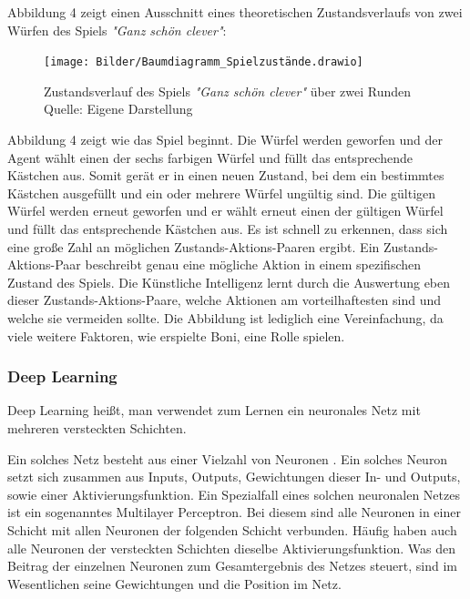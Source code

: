 Abbildung 4 zeigt einen Ausschnitt eines theoretischen Zustandsverlaufs von zwei Würfen des Spiels \textit{"Ganz schön clever"}:
\nopagebreak
\begin{figure}[H]
	\texttt{[image: Bilder/Baumdiagramm\_Spielzustände.drawio]} 
	\caption[Zustandsverlauf des Spiels \textit{"Ganz schön clever"} über zwei Runden]{Zustandsverlauf des Spiels \textit{"Ganz schön clever"} über zwei Runden\\ Quelle: Eigene Darstellung}
\end{figure}	

Abbildung 4 zeigt wie das Spiel beginnt. Die Würfel werden geworfen und der Agent wählt einen der sechs farbigen Würfel und füllt das entsprechende Kästchen aus. Somit gerät er in einen neuen Zustand, bei dem ein bestimmtes Kästchen ausgefüllt und ein oder mehrere Würfel ungültig sind. Die gültigen Würfel werden erneut geworfen und er wählt erneut einen der gültigen Würfel und füllt das entsprechende Kästchen aus. Es ist schnell zu erkennen, dass sich eine große Zahl an möglichen Zustands-Aktions-Paaren ergibt. Ein Zustands-Aktions-Paar beschreibt genau eine mögliche Aktion in einem spezifischen Zustand des Spiels. Die Künstliche Intelligenz lernt durch die Auswertung eben dieser Zustands-Aktions-Paare, welche Aktionen am vorteilhaftesten sind und welche sie vermeiden sollte. Die Abbildung ist lediglich eine Vereinfachung, da viele weitere Faktoren, wie erspielte Boni, eine Rolle spielen.
\subsubsection{Deep Learning}
Deep Learning heißt, man verwendet zum Lernen ein neuronales Netz mit mehreren versteckten Schichten. 

Ein solches Netz besteht aus einer Vielzahl von Neuronen \cite[Seite 75]{sewak_deep_2019}. Ein solches Neuron setzt sich zusammen aus Inputs, Outputs, Gewichtungen dieser In- und Outputs, sowie einer Aktivierungsfunktion. Ein Spezialfall eines solchen neuronalen Netzes ist ein sogenanntes Multilayer Perceptron. Bei diesem sind alle Neuronen in einer Schicht mit allen Neuronen der folgenden Schicht verbunden. Häufig haben auch alle Neuronen der versteckten Schichten dieselbe Aktivierungsfunktion. Was den Beitrag der einzelnen Neuronen zum Gesamtergebnis des Netzes steuert, sind im Wesentlichen seine Gewichtungen und die Position im Netz.\\

